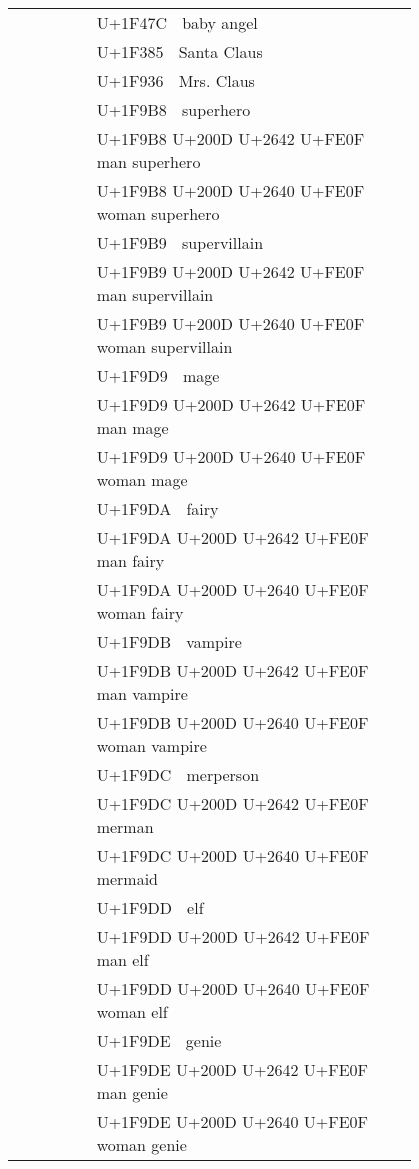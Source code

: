 \documentclass[a4paper,12pt]{ltjarticle}
\newcommand{\fontA}[1]{{\fontspec[RawFeature={mode=harf,+dist,+ccmp}]{Segoe UI Emoji} #1}}
\newcommand{\fontB}[1]{{\fontspec[RawFeature={mode=harf,+dist,+ccmp}]{Noto Color Emoji} #1}}
\begin{document}
\begin{longtable}[c]{ccp{0.8\linewidth}}
\fontA{👼}&\fontB{👼}&U+1F47C 👼 baby angel\\
\fontA{🎅}&\fontB{🎅}&U+1F385 🎅 Santa Claus\\
\fontA{🤶}&\fontB{🤶}&U+1F936 🤶 Mrs. Claus\\
\fontA{🦸}&\fontB{🦸}&U+1F9B8 🦸 superhero\\
\fontA{🦸‍♂️}&\fontB{🦸‍♂️}&U+1F9B8 U+200D U+2642 U+FE0F 🦸‍♂️ man superhero\\
\fontA{🦸‍♀️}&\fontB{🦸‍♀️}&U+1F9B8 U+200D U+2640 U+FE0F 🦸‍♀️ woman superhero\\
\fontA{🦹}&\fontB{🦹}&U+1F9B9 🦹 supervillain\\
\fontA{🦹‍♂️}&\fontB{🦹‍♂️}&U+1F9B9 U+200D U+2642 U+FE0F 🦹‍♂️ man supervillain\\
\fontA{🦹‍♀️}&\fontB{🦹‍♀️}&U+1F9B9 U+200D U+2640 U+FE0F 🦹‍♀️ woman supervillain\\
\fontA{🧙}&\fontB{🧙}&U+1F9D9 🧙 mage\\
\fontA{🧙‍♂️}&\fontB{🧙‍♂️}&U+1F9D9 U+200D U+2642 U+FE0F 🧙‍♂️ man mage\\
\fontA{🧙‍♀️}&\fontB{🧙‍♀️}&U+1F9D9 U+200D U+2640 U+FE0F 🧙‍♀️ woman mage\\
\fontA{🧚}&\fontB{🧚}&U+1F9DA 🧚 fairy\\
\fontA{🧚‍♂️}&\fontB{🧚‍♂️}&U+1F9DA U+200D U+2642 U+FE0F 🧚‍♂️ man fairy\\
\fontA{🧚‍♀️}&\fontB{🧚‍♀️}&U+1F9DA U+200D U+2640 U+FE0F 🧚‍♀️ woman fairy\\
\fontA{🧛}&\fontB{🧛}&U+1F9DB 🧛 vampire\\
\fontA{🧛‍♂️}&\fontB{🧛‍♂️}&U+1F9DB U+200D U+2642 U+FE0F 🧛‍♂️ man vampire\\
\fontA{🧛‍♀️}&\fontB{🧛‍♀️}&U+1F9DB U+200D U+2640 U+FE0F 🧛‍♀️ woman vampire\\
\fontA{🧜}&\fontB{🧜}&U+1F9DC 🧜 merperson\\
\fontA{🧜‍♂️}&\fontB{🧜‍♂️}&U+1F9DC U+200D U+2642 U+FE0F 🧜‍♂️ merman\\
\fontA{🧜‍♀️}&\fontB{🧜‍♀️}&U+1F9DC U+200D U+2640 U+FE0F 🧜‍♀️ mermaid\\
\fontA{🧝}&\fontB{🧝}&U+1F9DD 🧝 elf\\
\fontA{🧝‍♂️}&\fontB{🧝‍♂️}&U+1F9DD U+200D U+2642 U+FE0F 🧝‍♂️ man elf\\
\fontA{🧝‍♀️}&\fontB{🧝‍♀️}&U+1F9DD U+200D U+2640 U+FE0F 🧝‍♀️ woman elf\\
\fontA{🧞}&\fontB{🧞}&U+1F9DE 🧞 genie\\
\fontA{🧞‍♂️}&\fontB{🧞‍♂️}&U+1F9DE U+200D U+2642 U+FE0F 🧞‍♂️ man genie\\
\fontA{🧞‍♀️}&\fontB{🧞‍♀️}&U+1F9DE U+200D U+2640 U+FE0F 🧞‍♀️ woman genie\\

\end{longtable}
\end{document}
